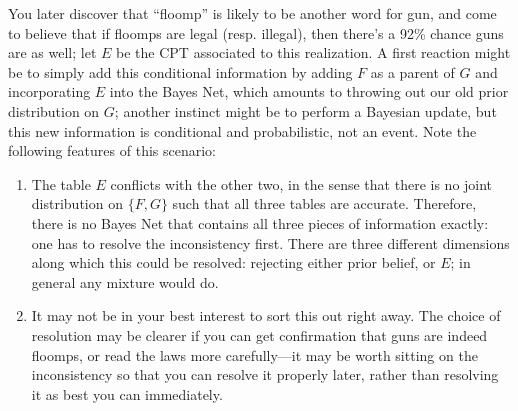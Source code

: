 \documentclass{article}
\newcommand\changed[1]{{\color{note-fg} #1}}
\begin{document}
\begin{example}
		You later discover that ``floomp'' is likely to be another word for gun, and come to believe that if floomps are legal (resp. illegal), then there's a 92\% chance guns are as well; \changed{let $E$ be the CPT associated to this realization.
		A first reaction might be to simply add this conditional information by adding $F$ as a parent of $G$ and incorporating $E$ into the Bayes Net, which amounts to throwing out our old prior distribution on $G$; another instinct might be to perform a Bayesian update, but this new information is conditional and probabilistic, not an event.}
		Note the following features of this scenario:
		
		\begin{enumerate}
			\item \changed{The table $E$ conflicts with the other two, in the sense that there is no joint distribution on $\{F, G\}$ such that all three tables are accurate. 
			Therefore, there is no Bayes Net that contains all three pieces of information exactly: one has to resolve the inconsistency first. 
			There are three different dimensions along which this could be resolved: rejecting either prior belief, or $E$; in general any mixture would do. 
			}\label{item:noarrow}
			
			\item It may not be in your best interest to sort this out right away. The choice of resolution may be clearer if you can get confirmation that guns are indeed floomps, or read the laws more carefully---it may be worth sitting on the inconsistency so that you can resolve it properly later, rather than resolving it as best you can immediately.\label{item:waiting-good}
		\end{enumerate}
%			
%			
%
		

\end{example}
\end{document}
